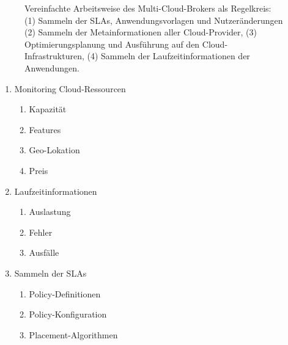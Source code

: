 \begin{figure}
	\centering	
	\def\svgwidth{0.95\textwidth}
	{\tiny \textsf{
	}}
	\caption{Vereinfachte Arbeitsweise des Multi-Cloud-Brokers als Regelkreis: (1) Sammeln der SLAs, Anwendungsvorlagen und Nutzeränderungen (2) Sammeln der Metainformationen aller Cloud-Provider, (3) Optimierungsplanung und Ausführung auf den Cloud-Infrastrukturen, (4) Sammeln der Laufzeitinformationen der Anwendungen.}
	\label{fig:cycle}
\end{figure}

\begin{minipage}[b]{0.45\linewidth}
\begin{flushleft}
\begin{enumerate}
\item Monitoring Cloud-Ressourcen
\begin{enumerate}
	\item Kapazität%
	\item Features%
	\item Geo-Lokation
	\item Preis
\end{enumerate}
\item Laufzeitinformationen%
\begin{enumerate}
	\item Auslastung
	\item Fehler
	\item Ausfälle
\end{enumerate}
\item Sammeln der SLAs
\begin{enumerate}
	\item Policy-Definitionen
	\item Policy-Konfiguration
	\item Placement-Algorithmen
\end{enumerate}
\end{enumerate}
\end{flushleft}
\end{minipage}
%
\hspace{0.5cm}
%
